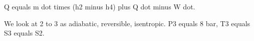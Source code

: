 Q equals m dot times (h2 minus h4) plus Q dot minus W dot.

We look at 2 to 3 as adiabatic, reversible, isentropic.
P3 equals 8 bar, T3 equals
S3 equals S2.